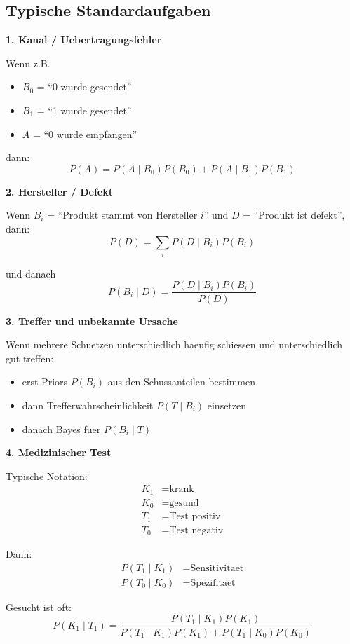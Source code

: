 \documentclass[a4paper,11pt]{article}
\begin{document}
\subsection{Typische Standardaufgaben}
\textbf{1. Kanal / Uebertragungsfehler}

Wenn z.B.
\begin{itemize}
  \item $B_0$ = ``0 wurde gesendet''
  \item $B_1$ = ``1 wurde gesendet''
  \item $A$ = ``0 wurde empfangen''
\end{itemize}

dann:
\[
P(A)=P(A\mid B_0)P(B_0)+P(A\mid B_1)P(B_1)
\]

\textbf{2. Hersteller / Defekt}

Wenn $B_i$ = ``Produkt stammt von Hersteller $i$'' und $D$ = ``Produkt ist defekt'', dann:
\[
P(D)=\sum_i P(D\mid B_i)P(B_i)
\]

und danach
\[
P(B_i\mid D)=\frac{P(D\mid B_i)P(B_i)}{P(D)}
\]

\textbf{3. Treffer und unbekannte Ursache}

Wenn mehrere Schuetzen unterschiedlich haeufig schiessen und unterschiedlich gut treffen:
\begin{itemize}
  \item erst Priors $P(B_i)$ aus den Schussanteilen bestimmen
  \item dann Trefferwahrscheinlichkeit $P(T\mid B_i)$ einsetzen
  \item danach Bayes fuer $P(B_i\mid T)$
\end{itemize}

\textbf{4. Medizinischer Test}

Typische Notation:
\begin{align*}
K_1 &= \text{krank} \\
K_0 &= \text{gesund} \\
T_1 &= \text{Test positiv} \\
T_0 &= \text{Test negativ}
\end{align*}

Dann:
\begin{align*}
P(T_1\mid K_1) &= \text{Sensitivitaet} \\
P(T_0\mid K_0) &= \text{Spezifitaet}
\end{align*}

Gesucht ist oft:
\[
P(K_1\mid T_1)
=\frac{P(T_1\mid K_1)P(K_1)}
{P(T_1\mid K_1)P(K_1)+P(T_1\mid K_0)P(K_0)}
\]
\end{document}
